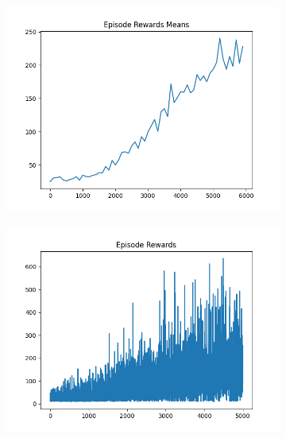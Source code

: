 \begin{figure}[H]
    \centering
    \begin{subfigure}{.47\linewidth}
        \centering
        \includegraphics[width=\textwidth]{pole/2024-06-14_00-20-45_dqn_cartpole_episode_rewards_means.png}
    \end{subfigure}
    \begin{subfigure}{.47\linewidth}
        \centering
        \includegraphics[width=\textwidth]{pole/2024-06-13_20-39-12_dqn_cartpole_episode_rewards.png}
    \end{subfigure}
    \begin{subfigure}{.47\linewidth}
        \centering

\end{subfigure}
\end{figure}
